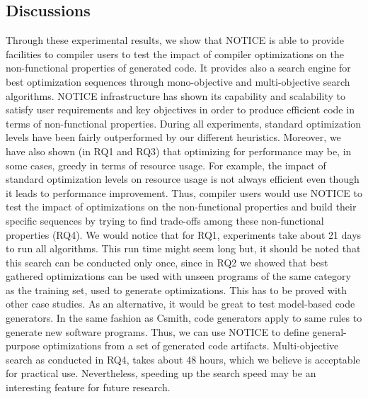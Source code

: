 \noindent{}
\subsection{Discussions}
Through these experimental results, we show that NOTICE is able to provide facilities to compiler users to test the impact of compiler optimizations on the non-functional properties of generated code. It provides also a search engine for best optimization sequences through mono-objective and multi-objective search algorithms. NOTICE infrastructure has shown its capability and scalability to satisfy user requirements and key objectives in order to produce efficient code in terms of non-functional properties. During all experiments, standard optimization levels have been fairly outperformed by our different heuristics. 
Moreover, we have also shown (in RQ1 and RQ3) that optimizing for performance may be, in some cases, greedy in terms of resource usage. For example, the impact of standard optimization levels on resource usage is not always efficient even though it leads to performance improvement. 
Thus, compiler users would use NOTICE to test the impact of optimizations on the non-functional properties and build their specific sequences by trying to find trade-offs among these non-functional properties (RQ4). We would notice that for RQ1, experiments take about 21 days to run all algorithms. This run time might seem long but, it should be noted that this search can be conducted only once, since in RQ2 we showed that best gathered optimizations can be used with unseen programs of the same category as the training set, used to generate optimizations. This has to be proved with other case studies. As an alternative, it would be great to test model-based code generators. In the same fashion as Csmith, code generators apply to same rules to generate new software programs. Thus, we can use NOTICE to define general-purpose optimizations from a set of generated code artifacts. 
Multi-objective search as conducted in RQ4, takes about 48 hours, which we believe is acceptable for practical use. Nevertheless, speeding up the search speed may be an interesting feature for future research.




